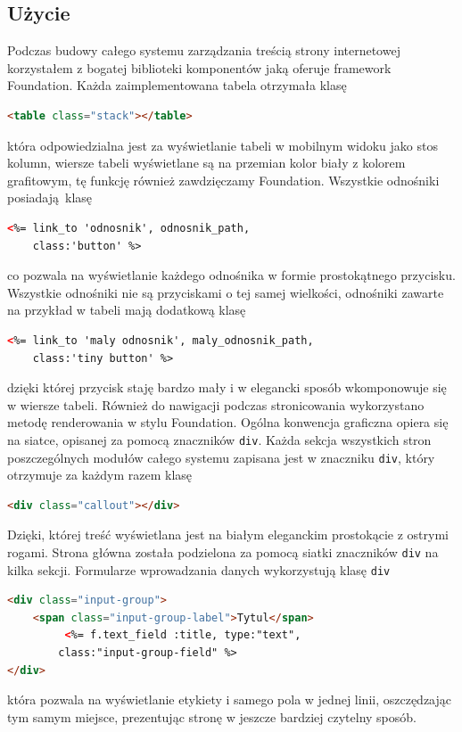 \documentclass[openright]{xmgr}
\begin{document}
\subsection{Użycie}
Podczas budowy całego systemu zarządzania treścią strony internetowej korzystałem z bogatej biblioteki komponentów jaką oferuje framework Foundation. Każda zaimplementowana tabela otrzymała klasę
\begin{lstlisting}[language=html, caption={Przykładowa tabela}]
<table class="stack"></table>
\end{lstlisting}
która odpowiedzialna jest za wyświetlanie tabeli w mobilnym widoku jako stos kolumn, wiersze tabeli wyświetlane są na przemian kolor biały z kolorem grafitowym, tę funkcję również  zawdzięczamy Foundation. Wszystkie odnośniki \mbox{posiadają klasę}
\begin{lstlisting}[language=html, caption={Przykładowy przycisk}]
<%= link_to 'odnosnik', odnosnik_path,
	class:'button' %>
\end{lstlisting}
co pozwala na wyświetlanie każdego odnośnika w formie prostokątnego przycisku. Wszystkie odnośniki nie są przyciskami o tej samej wielkości, odnośniki zawarte na przykład w tabeli mają dodatkową klasę
\begin{lstlisting}[language=html, caption={Przykładowy mały przycisk}]
<%= link_to 'maly odnosnik', maly_odnosnik_path,
	class:'tiny button' %>
\end{lstlisting}
dzięki której przycisk staję bardzo mały i w elegancki sposób wkomponowuje się w wiersze tabeli. Również do nawigacji podczas stronicowania wykorzystano metodę renderowania w stylu Foundation. Ogólna konwencja graficzna opiera się na siatce, opisanej za pomocą znaczników \texttt{div}. Każda sekcja wszystkich stron poszczególnych modułów całego systemu zapisana jest w znaczniku \texttt{div}, który otrzymuje za każdym razem klasę
\begin{lstlisting}[language=html, caption={Przykładowy div}]
<div class="callout"></div>
\end{lstlisting}
Dzięki, której treść wyświetlana jest na białym eleganckim prostokącie z ostrymi rogami. Strona główna została podzielona za pomocą siatki znaczników \texttt{div} na kilka sekcji. Formularze wprowadzania danych wykorzystują klasę \texttt{div}
\begin{lstlisting}[language=html, caption={Przykładowe pole tekstowe}]
<div class="input-group">
	<span class="input-group-label">Tytul</span>
         <%= f.text_field :title, type:"text",
		class:"input-group-field" %>
</div>
\end{lstlisting}
która pozwala na wyświetlanie etykiety i samego pola w jednej linii, oszczędzając tym samym miejsce, prezentując stronę w jeszcze bardziej czytelny sposób.
\end{document}
